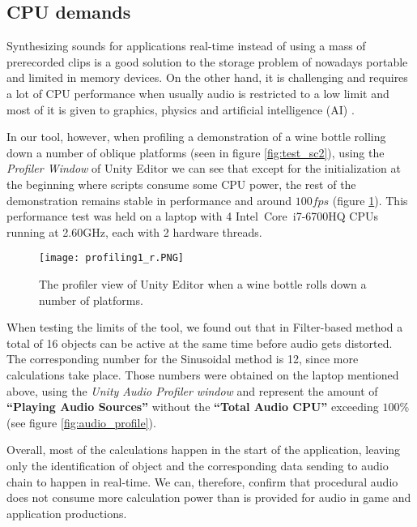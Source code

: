 \subsection{CPU demands}
Synthesizing sounds for applications real-time instead of using a mass of prerecorded clips is a good solution to the storage problem of nowadays portable and limited in memory devices. On the other hand, it is challenging and requires a lot of CPU performance when usually audio is restricted to a low limit and most of it is given to graphics, physics and artificial intelligence (AI) \cite{lloyd2011sound}. 

In our tool, however, when profiling a demonstration of a wine bottle rolling down a number of oblique platforms (seen in figure \ref{fig:test_sc2}), using the \textit{Profiler Window} of Unity\textsuperscript{\textregistered} Editor we can see that except for the initialization at the beginning where scripts consume some CPU power, the rest of the demonstration remains stable in performance and around $100 fps$ (figure \ref{fig:profile}). This performance test was held on a laptop with 4 Intel\textregistered\ Core\texttrademark\ i7-6700HQ CPUs running at 2.60GHz, each with 2 hardware threads.

\begin{figure}[H]
  \centering
    \texttt{[image: profiling1\_r.PNG]}
      \caption{The profiler view of Unity\textsuperscript{\textregistered} Editor when a wine bottle rolls down a number of platforms.}
      \label{fig:profile}
\end{figure} 

When testing the limits of the tool, we found out that in Filter-based method a total of 16 objects can be active at the same time before audio gets distorted. The corresponding number for the Sinusoidal method is 12, since more calculations take place. Those numbers were obtained on the laptop mentioned above, using the \textit{Unity\textsuperscript{\textregistered} Audio Profiler window} and represent the amount of \textbf{``Playing Audio Sources''} without the \textbf{``Total Audio CPU''} exceeding $100\%$ (see figure \ref{fig:audio_profile}).

Overall, most of the calculations happen in the start of the application, leaving only the identification of object and the corresponding data sending to audio chain to happen in real-time. We can, therefore, confirm that procedural audio does not consume more calculation power than is provided for audio in game and application productions.   

